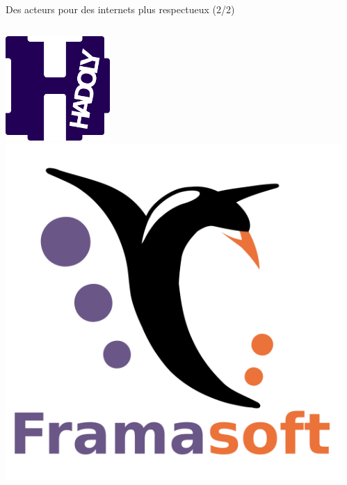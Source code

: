 \begin{frame}{Des acteurs pour des internets plus respectueux (2/2)}
  \begin{columns}
    \begin{column}{0.5\textwidth}
      \includegraphics[height=0.2\textheight]{un_autre_internet/hadoly.png}
      \includegraphics[height=0.2\textheight]{un_autre_internet/framasoft.png}
    \end{column}
    \begin{column}{0.5\textwidth}
    \begin{center}

\end{center}
\end{column}
\end{columns}
\end{frame}
